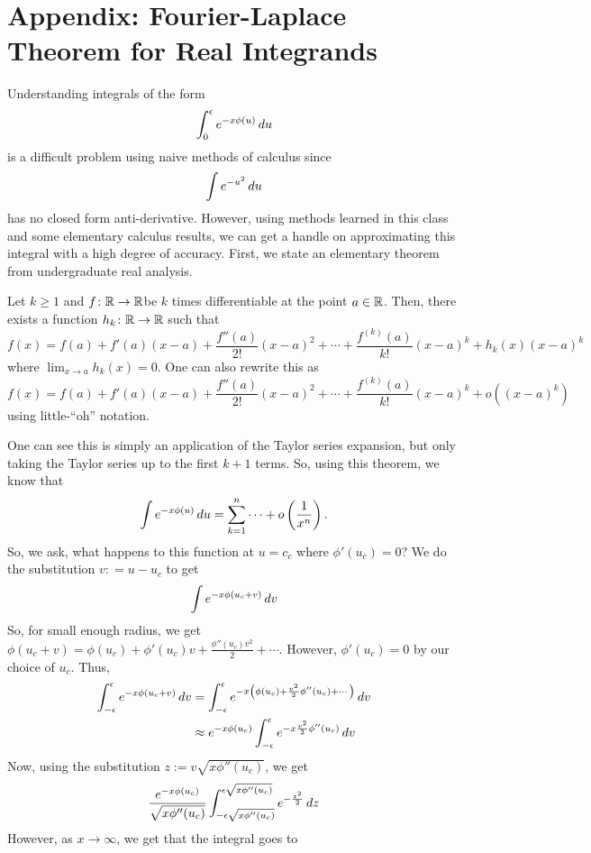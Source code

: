 \documentclass[11pt,leqno,oneside]{amsbook}
\numberwithin{thm}{section}
\begin{document}
\section{Appendix: Fourier-Laplace Theorem for Real Integrands}
Understanding integrals of the form \[
  \int_0^\epsilon e^{-x\phi(u)} \, d u
\]
is a difficult problem using naive methods of calculus since \[
  \int e^{-u^2} \, d u
\]
has no closed form anti-derivative. However, using methods learned in this
class and some elementary calculus results, we can get a handle on
approximating this integral with a high degree of accuracy. First, we
state an elementary theorem from undergraduate real analysis.
\begin{thm}
  Let \(k \geq 1\) and \(f \colon {\mathbb R} \to {\mathbb R}\)be \(k\) times
  differentiable at the point \(a \in {\mathbb R}\). Then, there exists a
  function \(h_k \colon {\mathbb R} \to {\mathbb R}\) such that \[
    f(x) = f(a) + f'(a)(x-a) + \frac{f''(a)}{2!}(x-a)^2 + \cdots +
    \frac{f^{(k)}(a)}{k!}(x-a)^k + h_k(x)(x-a)^k
  \]
  where \(\lim_{x \to a} h_k(x) = 0\). One can also rewrite this as \[
    f(x) = f(a) + f'(a)(x-a) + \frac{f''(a)}{2!}(x-a)^2 + \cdots +
    \frac{f^{(k)}(a)}{k!}(x-a)^k + o((x-a)^k)
  \]
  using little-``oh'' notation.
\end{thm}
One can see this is simply an application of the Taylor series
expansion, but only taking the Taylor series up to the first \(k+1\)
terms. So, using this theorem, we know that \[
  \int e^{-x \phi(u)} \, d u = \sum_{k=1}^n \cdots + o\left( \frac{1}{x^n} \right).
\]
So, we ask, what happens to this function at \(u = c_c\) where
\(\phi'(u_c)=0\)? We do the substitution \(v : = u - u_c\) to get \[
  \int e^{-x \phi(u_c+v)} \, d v
\]
So, for small enough radius, we get \(\phi(u_c + v) = \phi(u_c) +
\phi'(u_c)v + \frac{\phi''(u_c)v^2}{2} + \cdots\). However,
\(\phi'(u_c) = 0\) by our choice of \(u_c\). Thus,
\begin{align*}
  \int_{-\epsilon}^\epsilon e^{-x \phi(u_c+v)} \, d v
  & = \int_{-\epsilon}^\epsilon e^{-x \left( \phi(u_c) + \frac{v^2}{2}
    \phi''(u_c) + \cdots\right)} \, d v \\
  & \approx e^{-x\phi(u_c)} \int_{-\epsilon}^\epsilon e^{-x \frac{v^2}{2}
    \phi''(u_c)} \, d v
\end{align*}
Now, using the substitution \(z := v \sqrt{x \phi''(u_c)}\), we get \[
  \frac{e^{-x \phi(u_c)}}{\sqrt{x \phi''(u_c)}} \int_{- \epsilon
    \sqrt{x \phi''(u_c)}}^{\epsilon \sqrt{x \phi''(u_c)}}
  e^{-\frac{z^2}{2}} \, d z
\]
However, as \(x \to \infty\), we get that the integral goes to
\end{document}
